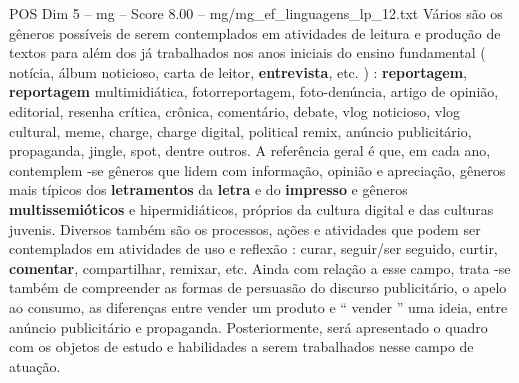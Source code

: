 \begin{textsample}{POS Dim 5 – mg – Score 8.00 – mg/mg\_ef\_linguagens\_lp\_12.txt}
Vários são os gêneros possíveis de serem contemplados em atividades de leitura e produção de textos para além dos já trabalhados nos anos iniciais do ensino fundamental ( notícia, álbum noticioso, carta de leitor, \textbf{entrevista}, etc. ) : \textbf{reportagem}, \textbf{reportagem} multimidiática, fotorreportagem, foto-denúncia, artigo de opinião, editorial, resenha crítica, crônica, comentário, debate, vlog noticioso, vlog cultural, meme, charge, charge digital, political remix, anúncio publicitário, propaganda, jingle, spot, dentre outros.
A referência geral é que, em cada ano, contemplem -se gêneros que lidem com informação, opinião e apreciação, gêneros mais típicos dos \textbf{letramentos} da \textbf{letra} e do \textbf{impresso} e gêneros \textbf{multissemióticos} e hipermidiáticos, próprios da cultura digital e das culturas juvenis.
Diversos também são os processos, ações e atividades que podem ser contemplados em atividades de uso e reflexão : curar, seguir/ser seguido, curtir, \textbf{comentar}, compartilhar, remixar, etc.
Ainda com relação a esse campo, trata -se também de compreender as formas de persuasão do discurso publicitário, o apelo ao consumo, as diferenças entre vender um produto e “ vender ” uma ideia, entre anúncio publicitário e propaganda.
Posteriormente, será apresentado o quadro com os objetos de estudo e habilidades a serem trabalhados nesse campo de atuação.

\end{textsample}

